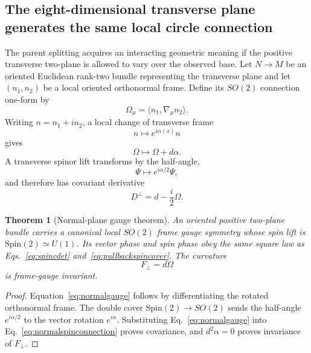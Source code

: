 \documentclass[11pt]{article}
\newtheorem{theorem}{Theorem}[section]
\theoremstyle{definition}\newtheorem{definition}[theorem]{Definition}
\theoremstyle{remark}\newtheorem{remark}[theorem]{Remark}\newtheorem{conjecture}[theorem]{Conjecture}
\begin{document}
\subsection{The eight-dimensional transverse plane generates the same local circle connection}
The parent splitting acquires an interacting geometric meaning if the positive transverse two-plane is allowed to vary over the observed base. Let $N\to M$ be an oriented Euclidean rank-two bundle representing the transverse plane and let $(n_1,n_2)$ be a local oriented orthonormal frame. Define its $SO(2)$ connection one-form by
\begin{equation}\label{eq:normalconnection}
 \Omega_\mu=\langle n_1,\nabla_\mu n_2\rangle.
\end{equation}
Writing $n=n_1+i n_2$, a local change of transverse frame
\begin{equation}
 n\mapsto e^{i\alpha(x)}n
\end{equation}
gives
\begin{equation}\label{eq:normalgauge}
 \boxed{\Omega\mapsto\Omega+d\alpha.}
\end{equation}
A transverse spinor lift transforms by the half-angle,
\begin{equation}
 \Psi\mapsto e^{i\alpha/2}\Psi,
\end{equation}
and therefore has covariant derivative
\begin{equation}\label{eq:normalspinconnection}
 \boxed{D^\perp=d-\frac{i}{2}\Omega.}
\end{equation}

\begin{theorem}[Normal-plane gauge theorem]\label{thm:normalplaneU1}
An oriented positive two-plane bundle carries a canonical local $SO(2)$ frame gauge symmetry whose spin lift is $\mathrm{Spin}(2)\simeq U(1)$. Its vector phase and spin phase obey the same square law as Eqs.~\eqref{eq:spincdet} and~\eqref{eq:pullbackspincover}. The curvature
\begin{equation}
 F_\perp=d\Omega
\end{equation}
is frame-gauge invariant.
\end{theorem}
\begin{proof}
Equation~\eqref{eq:normalgauge} follows by differentiating the rotated orthonormal frame. The double cover $\mathrm{Spin}(2)\to SO(2)$ sends the half-angle $e^{i\alpha/2}$ to the vector rotation $e^{i\alpha}$. Substituting Eq.~\eqref{eq:normalgauge} into Eq.~\eqref{eq:normalspinconnection} proves covariance, and $d^2\alpha=0$ proves invariance of $F_\perp$.
\end{proof}
\end{document}
